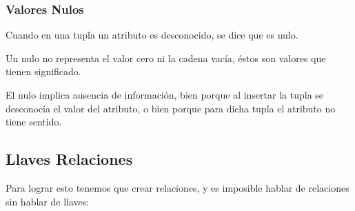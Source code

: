 \documentclass[12pt, fleqn]{report}                             %
\begin{document}
            \subsubsection{Valores Nulos}

                Cuando en una tupla un atributo es desconocido, se dice que es nulo.
                    
                Un nulo no representa el valor cero ni la cadena vacía, éstos son valores que
                tienen significado.

                El nulo implica ausencia de información, bien porque al insertar la tupla se 
                desconocía el valor del atributo, o bien porque para dicha tupla el atributo no
                tiene sentido.

            \clearpage
            \subsection{Llaves Relaciones}

                Para lograr esto tenemos que crear relaciones, y es imposible hablar de
                relaciones sin hablar de llaves:
\end{document}
